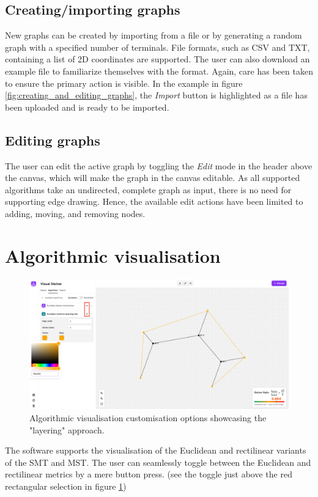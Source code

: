 \documentclass{l4proj}
\begin{document}
\subsection{Creating/importing graphs}
New graphs can be created by importing from a file or by generating a random graph with a specified number of terminals.
File formats, such as CSV and TXT, containing a list of 2D coordinates are supported. The user can also download an example file to familiarize themselves with the format.
Again, care has been taken to ensure the primary action is visible. In the example in figure \ref{fig:creating_and_editing_graphs}, the \textit{Import} button is highlighted as a file has been uploaded and is ready to be imported.

\subsection{Editing graphs}
The user can edit the active graph by toggling the \textit{Edit} mode in the header above the canvas, which will make the graph in the canvas editable. As all supported algorithms take an undirected, complete graph as input, there is no need for supporting edge drawing. Hence, the available edit actions have been limited to adding, moving, and removing nodes.

\section{Algorithmic visualisation}
\label{sec:algorithm_visualisation}
\begin{figure}[hp]
    \centering
    \begin{tcolorbox}[colframe=gray!20, colback=gray!5, boxrule=1pt, arc=0mm, boxsep=0pt, left=0pt, right=0pt, top=0pt, bottom=0pt]
        \includegraphics[width=\textwidth]{images/algorithm_visualisation.png}
    \end{tcolorbox}

    \caption{Algorithmic visualisation customisation options showcasing the "layering" approach.}
    \label{fig:algorithm_visualisation}
\end{figure}
The software supports the visualisation of the Euclidean and rectilinear variants of the SMT and MST. The user can seamlessly toggle between the Euclidean and rectilinear metrics by a mere button press. (see the toggle just above the red rectangular selection in figure \ref{fig:algorithm_visualisation})
\end{document}
